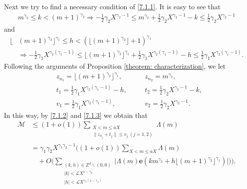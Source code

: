 \documentclass[12pt, reqno, twoside, letterpaper]{amsart}
\numberwithin{equation}{section}
\newcommand{\e}{\ensuremath{\mathbf{e}}}
\newcommand{\cL}{\ensuremath{\mathcal{L}}}
\newcommand{\cM}{\ensuremath{\mathcal{M}}}
\newcommand{\ZZ}{\ensuremath{\mathbb{Z}}}
\theoremstyle{customthm}
\theoremstyle{customrem}
\begin{document}
Next we try to find a necessary condition of \eqref{7.1.1}. It is easy to see that
\begin{align}
	\label{7.1.2}
m^{\gamma_2} \leqslant k < (m+1)^{\gamma_2} \Rightarrow -\frac{1}{2}\gamma_2 X^{\gamma_2-1} \leqslant m^{\gamma_2}+\frac{1}{2}\gamma_2 X^{\gamma_2-1} -k \leqslant \frac{1}{2}\gamma_2 X^{\gamma_2-1}
\end{align}
and
\begin{align}
	\label{7.1.3}
\nonumber \lfloor &(m+1)^{\gamma_2}\rfloor^{\gamma_1} \leqslant h < (\lfloor (m+1)^{\gamma_2}\rfloor+1)^{\gamma_1} \\ &\Rightarrow -\frac{1}{2}\gamma_1 X^{\gamma_2(\gamma_1-1)} \leqslant\lfloor (m+1)^{\gamma_2}\rfloor^{\gamma_1}+\frac{1}{2}\gamma_1 X^{\gamma_2(\gamma_1-1)} -h \leqslant\frac{1}{2}\gamma_1 X^{\gamma_2(\gamma_1-1)}.
\end{align}
Following the arguments of Proposition \ref{theorem: characterization}, we let
\begin{align*}
&z_{n_1} = \lfloor(m+1)^{\gamma_2}\rfloor^{\gamma_1}, \quad &&z_{n_2} = m^{\gamma_2}, \\
&t_1 = \frac{1}{2}\gamma_1 X^{\gamma_2(\gamma_1-1)} -h, \quad &&t_2 = \frac{1}{2}\gamma_2 X^{\gamma_2-1} -k, \\
&v_1 = \frac{1}{2}\gamma_1 X^{\gamma_2(\gamma_1-1)}, \quad &&v_2 = \frac{1}{2}\gamma_2 X^{\gamma_2-1}.
\end{align*}
In this way, by \eqref{7.1.2} and \eqref{7.1.3} we obtain that
\begin{align}
	\label{7.1.4}
\nonumber \cM &\leqslant (1+o(1)) \sum_{\substack{X < m \leqslant aX \\ \| z_{n_j} + t_j \| \leqslant v_j \ (j=1,2)}}\Lambda(m) \\
\nonumber &= \gamma_1\gamma_2 X^{\gamma_1\gamma_2-1} \bigg( (1+o(1)) \sum_{X < m \leqslant aX}\Lambda(m) \\
&\quad+O\Big( \sum_{\substack{(k,h) \in \ZZ^d \backslash (0,0) \\ |k|<\cL X^{1-\gamma_2} \\ |h|<\cL X^{\gamma_2(1-\gamma_1)}}} \Big| \Lambda(m) \e (km^{\gamma_2} + h\lfloor(m+1)^{\gamma_2}\rfloor^{\gamma_1}) \Big| \Big) \bigg).
\end{align}
\end{document}
